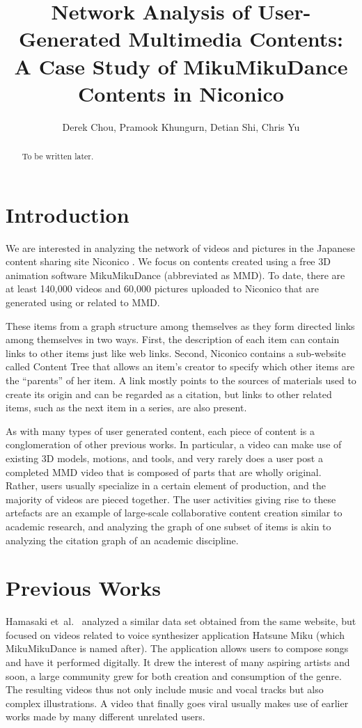 \documentclass[10pt, a4paper]{article}
\title{Network Analysis of User-Generated Multimedia Contents:\\
A Case Study of MikuMikuDance Contents in Niconico}
\author{Derek Chou, Pramook Khungurn, Detian Shi, Chris Yu}
\newcommand{\etal}{{et~al.}}
\begin{document}
\maketitle

\begin{abstract}
To be written later.
\end{abstract}

\section{Introduction}

We are interested in analyzing the network of videos and pictures in the Japanese content sharing site Niconico \cite{niconico}. 
We focus on contents created using a free 3D animation software MikuMikuDance \cite{mmd} (abbreviated as MMD). 
To date, there are at least 140,000 videos and 60,000 pictures uploaded to Niconico that are generated using or related to MMD. 

These items from a graph structure among themselves as they form directed links among themselves in two ways. 
First, the description of each item can contain links to other items just like web links. 
Second, Niconico contains a sub-website called Content Tree \cite{content-tree} that allows an item’s creator to specify which other items are the “parents” of her item. 
A link mostly points to the sources of materials used to create its origin and can be regarded as a citation, but links to other related items, such as the next item in a series, are also present. 

As with many types of user generated content, each piece of content is a conglomeration of other previous works. In particular, a video can make use of existing 3D models, motions, and tools, and very rarely does a user post a completed MMD video that is composed of parts that are wholly original. Rather, users usually specialize in a certain element of production, and the majority of videos are pieced together. The user activities giving rise to these artefacts are an example of large-scale collaborative content creation similar to academic research, and analyzing the graph of one subset of items is akin to analyzing the citation graph of an academic discipline.

\section{Previous Works}

Hamasaki \etal~\cite{Hamasaki:2008} analyzed a similar data set obtained from the same website, but focused on videos related to voice synthesizer application Hatsune Miku (which MikuMikuDance is named after). 
The application allows users to compose songs and have it performed digitally. 
It drew the interest of many aspiring artists and soon, a large community grew for both creation and consumption of the genre. 
The resulting videos thus not only include music and vocal tracks but also complex illustrations. 
A video that finally goes viral usually makes use of earlier works made by many different unrelated users. 
\end{document}
